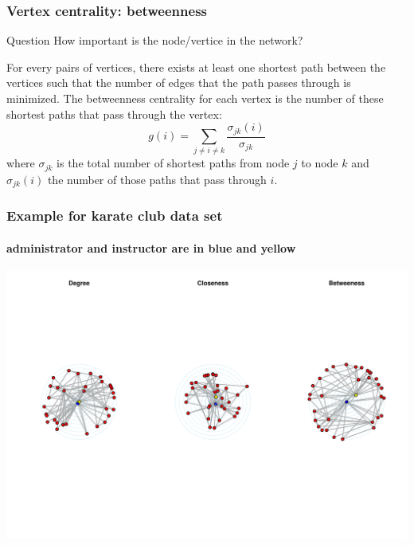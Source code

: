 \documentclass{beamer}\usepackage[]{graphicx}\usepackage[]{color}
\newenvironment{knitrout}{}{} %
\begin{document}
\begin{frame}
  \frametitle{Vertex centrality: betweenness}

  \begin{block}{Question}
    How important is the node/vertice in the network?
  \end{block}

  \begin{definition}[Betweenness]
    For every pairs of vertices, there exists at least one shortest path between the vertices such that the number of edges that the path passes through is minimized.
    The betweenness centrality for each vertex is the number of these shortest paths that pass through the vertex: 
    \[
        g(i)=\sum _{{j\neq i\neq k}}{\frac  {\sigma _{{jk}}(i)}{\sigma _{{jk}}}}    
    \]
    where $\sigma _{jk}$ is the total number of shortest paths from node $j$ to node $k$ and $\sigma _{jk}(i)$ the number of those paths that pass through $i$.

  \end{definition}

\end{frame}

\begin{frame}[fragile]
  \frametitle{Example for karate club data set}
  \framesubtitle{administrator and instructor are in blue and yellow}

\begin{knitrout}\scriptsize
{}\color{fgcolor}
\includegraphics[width=\textwidth]{figures/density-1} 

\end{knitrout}



\end{frame}
\end{document}
